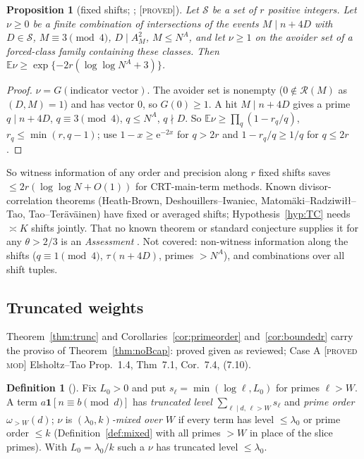 \documentclass[10pt,reqno]{amsart}
\newtheorem{proposition}[theorem]{Proposition}
\theoremstyle{definition}
\newtheorem{definition}[theorem]{Definition}
\theoremstyle{remark}
\newcommand{\cR}{\mathscr R}
\newcommand{\E}{\mathbb E}
\newcommand{\ind}{\mathbf 1}
\newcommand{\e}{\mathrm e}
\newcommand{\lab}[1]{\textup{[\textsc{#1}]}}
\begin{document}
\begin{proposition}[fixed shifts; {\cite[Prop.~4.3 and extension]{TU}}; \lab{proved}]\label{prop:fixedshift}
Let $\mathcal S$ be a set of $r$ positive integers.  Let $\nu\geq0$ be a finite
combination of intersections of the events $M\mid n+4D$ with $D\in\mathcal S$,
$M\equiv3\pmod4$, $D\mid A_M^2$, $M\leq N^A$, and let $\nu\geq1$ on the avoider set
of a forced-class family containing these classes.  Then
$\E\nu\geq\exp\{-2r(\log\log N^A+3)\}$.
\end{proposition}
\begin{proof}
$\nu=G(\text{indicator vector})$.  The avoider set is nonempty ($0\notin\cR(M)$
as $(D,M)=1$) and has vector $0$, so $G(0)\geq1$.  A hit $M\mid n+4D$ gives a
prime $q\mid n+4D$, $q\equiv3\pmod4$, $q\leq N^A$, $q\nmid D$.  So $\E\nu\geq\prod_q(1-r_q/q)$,
$r_q\leq\min(r,q-1)$; use $1-x\geq\e^{-2x}$ for $q>2r$ and $1-r_q/q\geq1/q$ for $q\leq2r$.
\end{proof}
So witness information of any order and precision along $r$ fixed shifts
saves $\leq2r(\log\log N+O(1))$ for CRT-main-term methods.  Known
divisor-correlation theorems (Heath-Brown, Deshouillers--Iwaniec,
Matom\"aki--Radziwi\l\l--Tao, Tao--Ter\"av\"ainen) have fixed or averaged
shifts; Hypothesis~\ref{hyp:TC} needs $\asymp K$ shifts jointly.  That no known
theorem or standard conjecture supplies it for any $\theta>2/3$ is an
\emph{Assessment} \cite[Ass.~4.4]{TU}.  Not covered: non-witness
information along the shifts ($q\equiv1\pmod4$, $\tau(n+4D)$, primes $>N^A$), and
combinations over all shift tuples.

\subsection{Truncated weights}\label{sec:TUtrunc}
Theorem~\ref{thm:trunc} and Corollaries~\ref{cor:primeorder}
and~\ref{cor:boundedr} carry the proviso of Theorem~\ref{thm:noBcap}: proved
given \cite{KA,KA2} as reviewed; Case A \lab{proved mod} Elsholtz--Tao
Prop.~1.4, Thm~7.1, Cor.~7.4, (7.10).

\begin{definition}[{\cite[Def.~5.0]{KA3}}]\label{def:trunc}
Fix $L_0>0$ and put $s_\ell=\min(\log\ell,L_0)$ for primes $\ell>W$.  A term
$a\ind[n\equiv b\pmod d]$ has \emph{truncated level} $\sum_{\ell\mid d,\,\ell>W}s_\ell$ and
\emph{prime order} $\omega_{>W}(d)$; $\nu$ is \emph{$(\lambda_0,k)$-mixed over $W$} if every term
has level $\leq\lambda_0$ or prime order $\leq k$ (Definition~\ref{def:mixed} with
all primes $>W$ in place of the slice primes).  With $L_0=\lambda_0/k$ such a $\nu$
has truncated level $\leq\lambda_0$.
\end{definition}
\end{document}
